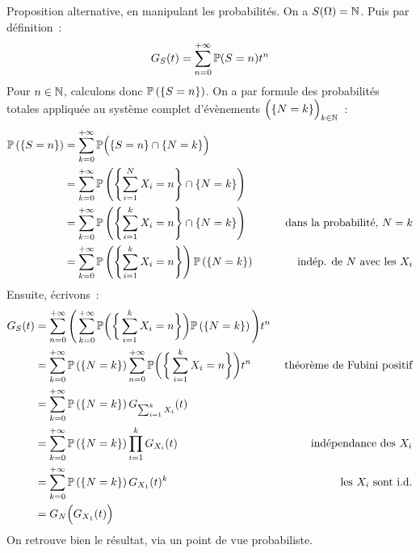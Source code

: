 \begin{demonstration}
    Proposition alternative, en manipulant les probabilités. On a $S(\Omega) = \mathbb{N}$. Puis par définition~:
    $$G_S(t) = \sum_{n=0}^{+\infty} \mathbb{P}(S=n)t^n$$
    Pour $n \in \mathbb{N}$, calculons donc $\mathbb{P}\left(\left\{S=n\right\}\right)$. On a par formule des probabilités totales appliquée au système complet d'évènements $\Big( \{N = k\}\Big)_{k \in \mathbb{N}}$~:
    \begin{align*}
        \mathbb{P}\left(\left\{S=n\right\}\right) &= \sum_{k=0}^{+ \infty}\mathbb{P}\Big(\{S = n\} \cap \{N = k\}\Big) \qquad\\
        &= \sum_{k=0}^{+ \infty}\mathbb{P}\left(\left\{\sum_{i=1}^N X_i = n\right\} \cap \{N = k\}\right)\\
        &= \sum_{k=0}^{+ \infty}\mathbb{P}\left(\left\{\sum_{i=1}^k X_i = n\right\} \cap \{N = k\}\right)\qquad &\text{dans la probabilité, } N = k\\
        &= \sum_{k=0}^{+ \infty}\mathbb{P}\left(\left\{\sum_{i=1}^k X_i = n\right\}\right) \mathbb{P}\left(\{N = k\}\right) \qquad &\text{indép. de } N \text{ avec les } X_i
    \end{align*}
    Ensuite, écrivons~:
    \begin{align*}
        G_S(t) &= \sum_{n=0}^{+ \infty} \Bigg( \sum_{k=0}^{+ \infty}\mathbb{P}\bigg(\bigg\{\sum_{i=1}^k X_i = n\bigg\}\bigg) \mathbb{P}\left(\left\{N = k\right\}\right) \Bigg)t^n\\
        &= \sum_{k=0}^{+\infty} \mathbb{P}\left(\left\{N=k\right\}\right) \sum_{n=0}^{+\infty} \mathbb{P} \bigg( \bigg\{ \sum_{i=1}^k X_i = n \bigg\}\bigg) t^n \qquad &\text{théorème de Fubini positif}\\
        &= \sum_{k=0}^{+\infty} \mathbb{P}\left(\left\{N = k\right\}\right) G_{\sum_{i = 1}^k X_i} (t)\\
        &= \sum_{k=0}^{+\infty} \mathbb{P}\left(\left\{N = k\right\}\right) \prod_{i = 1}^k G_{X_i}(t) \qquad & \text{indépendance des } X_i\\
        &= \sum_{k=0}^{+\infty} \mathbb{P}\left(\left\{N=k\right\}\right) G_{X_1}(t)^k \qquad &\text{les } X_i \text{ sont i.d.}\\
        &= G_N\Big(G_{X_1}(t)\Big)
    \end{align*}
    On retrouve bien le résultat, via un point de vue probabiliste.

\end{demonstration}

\addtocounter{boite}{-1}

